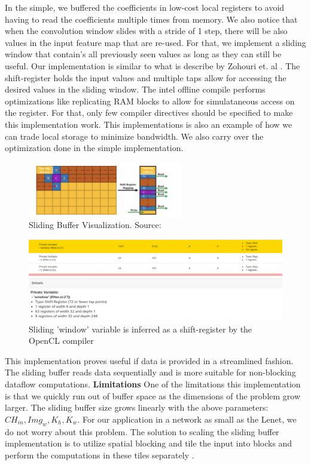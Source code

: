 In the simple, we buffered the coefficients in low-cost local registers to avoid having to read the coefficients multiple times from memory. We also notice that when the convolution window slides with a stride of 1 step, there will be also values in the input feature map that are re-used. For that, we implement a sliding window that contain's all previously seen values as long as they can still be useful. Our implementation is similar to what is describe by Zohouri et. al \cite{2018combined}. The shift-register holds the input values and multiple taps allow for accessing the desired values in the sliding window. The intel offline compile performs optimizations like replicating RAM blocks to allow for simulataneous access on the register. For that, only few compiler directives should be specified to make this implementation work. This implementations is also an example of how we can trade local storage to minimize bandwidth. We also carry over the optimization done in the simple implementation.

\begin{figure}[h]
\centering
\includegraphics[width=0.6\textwidth]{Figures/slidingbuffer}
\decoRule
\caption[Sliding Buffer]{ Sliding Buffer Visualization. Source: \cite{2018combined}}
\label{fig:sliding buffer}
\end{figure}

\begin{figure}[h]
\centering
\includegraphics[width=1.0\textwidth]{Figures/shiftregister}
\decoRule
\caption[Shift Register]{ Sliding 'window' variable is inferred as a shift-register by the OpenCL compiler }
\label{fig:shiftregister}
\end{figure}

This implementation proves useful if data is provided in a streamlined fashion. The sliding buffer reads data sequentially and is more suitable for non-blocking dataflow computations.
\newline
\textbf{Limitations}
\newline
One of the limitations this implementation is that we quickly run out of buffer space as the dimensions of the problem grow larger. The sliding buffer size grows linearly with the above parameters: $ CH_{in}, Img_{w}, K_h, K_w $. For our application in a network as small as the Lenet, we do not worry about this problem. The solution to scaling the sliding buffer implementation is to utilize spatial blocking and tile the input into blocks and perform the computations in these tiles separately \cite{2018combined}.


